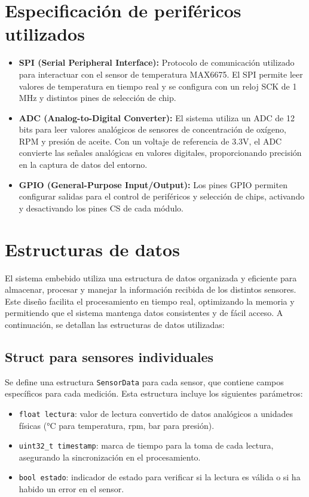 \section{Especificación de periféricos utilizados}

\begin{itemize}
    \item \textbf{SPI (Serial Peripheral Interface):} Protocolo de comunicación utilizado para interactuar con el sensor de temperatura MAX6675. El SPI permite leer valores de temperatura en tiempo real y se configura con un reloj SCK de 1 MHz y distintos pines de selección de chip.
    
    \item \textbf{ADC (Analog-to-Digital Converter):} El sistema utiliza un ADC de 12 bits para leer valores analógicos de sensores de concentración de oxígeno, RPM y presión de aceite. Con un voltaje de referencia de 3.3V, el ADC convierte las señales analógicas en valores digitales, proporcionando precisión en la captura de datos del entorno.
    
    \item \textbf{GPIO (General-Purpose Input/Output):} Los pines GPIO permiten configurar salidas para el control de periféricos y selección de chips, activando y desactivando los pines CS de cada módulo.
\end{itemize}

\section{Estructuras de datos}

El sistema embebido utiliza una estructura de datos organizada y eficiente para almacenar, procesar y manejar la información recibida de los distintos sensores. Este diseño facilita el procesamiento en tiempo real, optimizando la memoria y permitiendo que el sistema mantenga datos consistentes y de fácil acceso. A continuación, se detallan las estructuras de datos utilizadas:

\subsection{Struct para sensores individuales}

Se define una estructura \texttt{SensorData} para cada sensor, que contiene campos específicos para cada medición. Esta estructura incluye los siguientes parámetros:

\begin{itemize}
    \item \texttt{float lectura}: valor de lectura convertido de datos analógicos a unidades físicas (°C para temperatura, rpm, bar para presión).
    \item \texttt{uint32\_t timestamp}: marca de tiempo para la toma de cada lectura, asegurando la sincronización en el procesamiento.
    \item \texttt{bool estado}: indicador de estado para verificar si la lectura es válida o si ha habido un error en el sensor.
\end{itemize}

